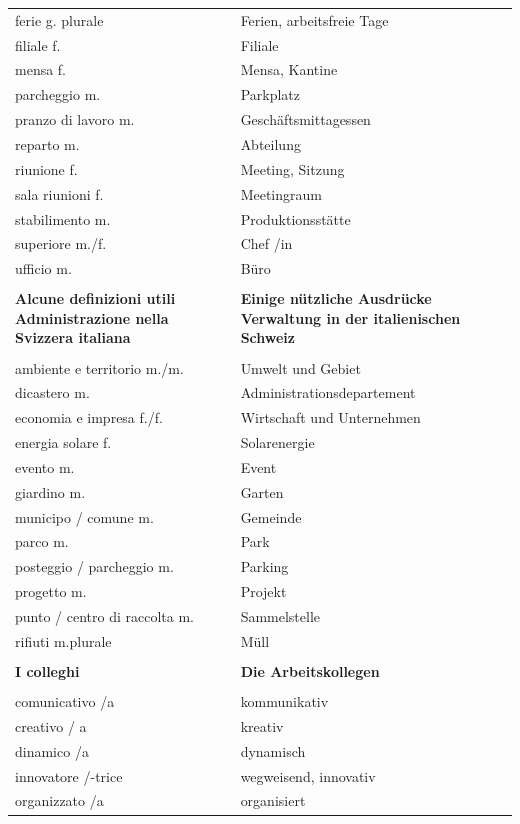 \documentclass[10pt]{scrartcl}
\begin{document}
\begin{multicols*}{2}
\begin{supertabular}{p{4cm}p{4cm}}
ferie \hfill g. plurale & Ferien, arbeitsfreie Tage\\
filiale \hfill f. & Filiale\\
mensa \hfill f. & Mensa, Kantine\\
parcheggio \hfill m. & Parkplatz\\
pranzo di lavoro \hfill m. & Geschäftsmittagessen\\
reparto \hfill m. & Abteilung\\
riunione \hfill f. & Meeting, Sitzung\\
sala riunioni \hfill f. & Meetingraum\\
stabilimento \hfill m. & Produktionsstätte\\
superiore \hfill m./f. & Chef /in\\
ufficio \hfill m. & Büro\\
\\
\textbf{Alcune definizioni utili Administrazione nella Svizzera italiana} & \textbf{Einige nützliche Ausdrücke  Verwaltung in der italienischen Schweiz}\\
\\
ambiente e territorio \hfill m./m. & Umwelt und Gebiet\\
dicastero \hfill m. & Administrationsdepartement\\
economia e impresa \hfill f./f. & Wirtschaft und Unternehmen\\
energia solare \hfill f. & Solarenergie\\
evento \hfill m. & Event\\
giardino \hfill m. & Garten\\
municipo / comune \hfill m. & Gemeinde\\
parco \hfill m. & Park\\
posteggio / parcheggio \hfill m. & Parking\\
progetto \hfill m. & Projekt\\
punto / centro di raccolta \hfill m. & Sammelstelle\\
rifiuti \hfill m.plurale & Müll\\
\\
\textbf{I colleghi} & \textbf{Die Arbeitskollegen}\\
\\
comunicativo /a & kommunikativ\\
creativo / a & kreativ\\
dinamico /a & dynamisch\\
innovatore /-trice & wegweisend, innovativ\\
organizzato /a & organisiert\\

\end{supertabular}
\end{multicols*}
\end{document}
